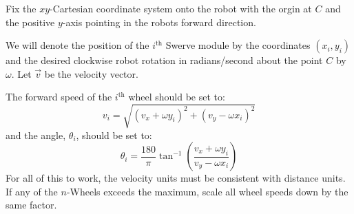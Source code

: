 \documentclass[a4paper]{article}
\begin{document}
Fix the $xy$-Cartesian coordinate system onto the robot with the orgin at $C$ and the positive $y$-axis pointing in the robots forward direction. 

We will denote the position of the $i^\text{th}$ Swerve module by the coordinates $(x_i,y_i)$ and the desired clockwise robot rotation in radians/second about the point $C$ by $\omega$. Let $\vec v$ be the velocity vector. 

The forward speed of the $i^\text{th}$ wheel should be set to: $$v_i=\sqrt{\left(v_x+\omega y_i\right)^2+\left(v_y-\omega x_i\right)^2}$$
and the angle, $\theta_i$, should be set to: $$\theta_i=\frac{180}{\pi}\tan^{-1}\left(\frac{v_x+\omega y_i}{v_y-\omega x_i}\right)$$
For all of this to work, the velocity units must be consistent with distance units. If any of the $n$-Wheels exceeds the maximum, scale all wheel speeds down by the same factor. 
\end{document}
